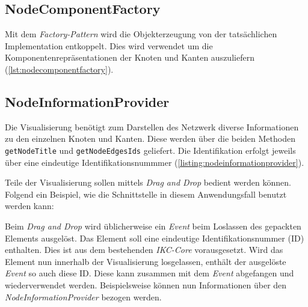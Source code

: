 \subsection{NodeComponentFactory}
Mit dem \textit{Factory-Pattern} wird die Objekterzeugung von der tatsächlichen Implementation entkoppelt. Dies wird verwendet um die Komponentenrepräsentationen der Knoten und Kanten auszuliefern (\autoref{lst:nodecomponentfactory}).


\subsection{NodeInformationProvider}
Die Visualisierung benötigt zum Darstellen des Netzwerk diverse Informationen zu den einzelnen Knoten und Kanten. Diese werden über die beiden Methoden \texttt{getNodeTitle} und \texttt{getNodeEdgesIds} geliefert. Die Identifikation erfolgt jeweils über eine eindeutige Identifikationsnummmer (\autoref{listing:nodeinformationprovider}).

Teile der Visualisierung sollen mittels \textit{Drag and Drop} bedient werden können. Folgend ein Beispiel, wie die Schnittstelle in diesem Anwendungsfall benutzt werden kann:

Beim \textit{Drag and Drop} wird üblicherweise ein \textit{Event} beim Loslassen des gepackten Elements ausgelöst. Das Element soll eine eindeutige Identifikationsnummer (ID) enthalten. Dies ist aus dem bestehenden \textit{IKC-Core} vorausgesetzt. Wird das Element nun innerhalb der Visualisierung losgelassen, enthält der ausgelöste \textit{Event} so auch diese ID. Diese kann zusammen mit dem \textit{Event} abgefangen und wiederverwendet werden. Beispielsweise können nun Informationen über den \textit{NodeInformationProvider} bezogen werden.


